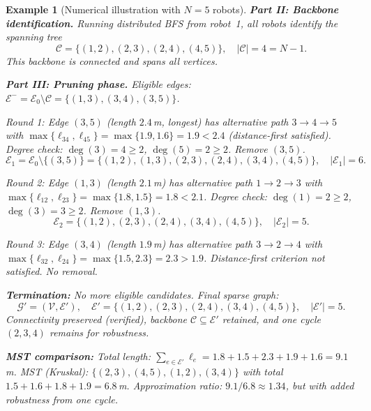 \documentclass[conference]{IEEEconf}
\theoremstyle{plain}
\newtheorem{example}{Example}
\begin{document}
\begin{example}[Numerical illustration with $N=5$ robots]
\noindent\textbf{Part II: Backbone identification.}
Running distributed BFS from robot~1, all robots identify the spanning tree
\[
\mathcal{C} = \{(1,2), (2,3), (2,4), (4,5)\}, \quad |\mathcal{C}|=4=N-1.
\]
This backbone is connected and spans all vertices.

\noindent\textbf{Part III: Pruning phase.}
Eligible edges: $\mathcal{E}^-=\mathcal{E}_0\setminus\mathcal{C}=\{(1,3), (3,4), (3,5)\}$.

\emph{Round 1:} Edge $(3,5)$ (length $2.4$\,m, longest) has alternative path $3\to 4\to 5$ with $\max\{\ell_{34},\ell_{45}\}=\max\{1.9,1.6\}=1.9<2.4$ (distance-first satisfied). Degree check: $\deg(3)=4\ge 2$, $\deg(5)=2\ge 2$. Remove $(3,5)$.
\[
\mathcal{E}_1 = \mathcal{E}_0\setminus\{(3,5)\}=\{(1,2), (1,3), (2,3), (2,4), (3,4), (4,5)\}, \quad |\mathcal{E}_1|=6.
\]

\emph{Round 2:} Edge $(1,3)$ (length $2.1$\,m) has alternative path $1\to 2\to 3$ with $\max\{\ell_{12},\ell_{23}\}=\max\{1.8,1.5\}=1.8<2.1$. Degree check: $\deg(1)=2\ge 2$, $\deg(3)=3\ge 2$. Remove $(1,3)$.
\[
\mathcal{E}_2 = \{(1,2), (2,3), (2,4), (3,4), (4,5)\}, \quad |\mathcal{E}_2|=5.
\]

\emph{Round 3:} Edge $(3,4)$ (length $1.9$\,m) has alternative path $3\to 2\to 4$ with $\max\{\ell_{32},\ell_{24}\}=\max\{1.5,2.3\}=2.3>1.9$. Distance-first criterion \emph{not} satisfied. No removal.

\noindent\textbf{Termination:} No more eligible candidates. Final sparse graph:
\[
\mathcal{G}'=(\mathcal{V},\mathcal{E}'), \quad \mathcal{E}'=\{(1,2), (2,3), (2,4), (3,4), (4,5)\}, \quad |\mathcal{E}'|=5.
\]
Connectivity preserved (verified), backbone $\mathcal{C}\subseteq\mathcal{E}'$ retained, and one cycle $(2,3,4)$ remains for robustness.

\noindent\textbf{MST comparison:}
Total length: $\sum_{e\in\mathcal{E}'}\ell_e=1.8+1.5+2.3+1.9+1.6=9.1$\,m.
MST (Kruskal): $\{(2,3), (4,5), (1,2), (3,4)\}$ with total $1.5+1.6+1.8+1.9=6.8$\,m.
Approximation ratio: $9.1/6.8\approx 1.34$, but with added robustness from one cycle.

\end{example}
\end{document}

